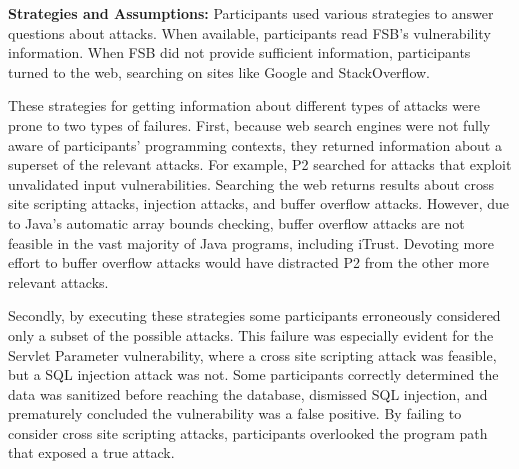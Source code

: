 \documentclass[10pt,journal,compsoc]{IEEEtran}
\begin{document}



\textbf{Strategies and Assumptions:}
Participants used various strategies to answer questions about attacks.
When available, participants read FSB's vulnerability information. 
When FSB did not provide sufficient information, participants turned to the web, searching on sites like Google and StackOverflow. 

These strategies for getting information about different types of attacks were prone to two types of failures. 
First, because web search engines were not fully aware of participants' programming contexts, they returned information about a superset of the relevant attacks.
For example, P2 searched for attacks that exploit unvalidated input vulnerabilities.
Searching the web returns results about cross site scripting attacks, injection attacks, and buffer overflow attacks. 
However, due to Java's automatic array bounds checking, buffer overflow attacks are not feasible in the vast majority of Java programs, including iTrust.
Devoting more effort to buffer overflow attacks would have distracted P2 from the other more relevant attacks. 


Secondly, by executing these strategies some participants erroneously considered only a subset of the possible attacks. 
This failure was especially evident for the Servlet Parameter vulnerability, where a cross site scripting attack was feasible, but a SQL injection attack was not. 
Some participants correctly determined the data was sanitized before reaching the database, dismissed SQL injection, and prematurely concluded the vulnerability was a false positive.
By failing to consider cross site scripting attacks, participants overlooked the program path that exposed a true attack.
\end{document}
